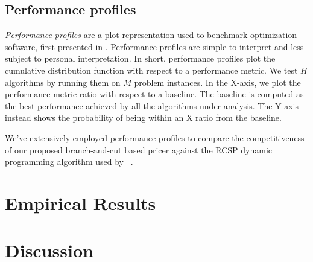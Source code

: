 \subsection{Performance profiles}
\label{sec:results-performance-profiles}

\textit{Performance profiles} are a plot representation used to benchmark optimization software,
first presented in \textcite{dolan2002}.
Performance profiles are simple to interpret and less subject to personal interpretation.
In short, performance profiles plot the cumulative distribution function with respect to a performance metric.
We test $H$ algorithms by running them on $M$ problem instances.
In the X-axis, we plot the performance metric ratio with respect to a baseline.
The baseline is computed as the best performance achieved by all the algorithms under analysis.
The Y-axis instead shows the probability of being within an X ratio from the baseline.

\medskip

We've extensively employed performance profiles to compare the competitiveness of
our proposed branch-and-cut based pricer
against the RCSP dynamic programming algorithm used by \bapcod\ \parencite{pessoa2020a}.

\begin{comment}
In this thesis, we will use performance profiles extensively to measure each solver by exploiting two performance metrics: \textbf{Time metric}, \textbf{Cost metric}.

A \textbf{Time performance profile} will tell us which resolution method is the fastest in terms of runtime.
A \textbf{Cost performance profile}, instead, will show us the cost ratio of the best upper bound obtained from each resolution method.
The ground truth optimal, as extracted from the dataset, is used instead as the cost baseline.
\end{comment}

\section{Empirical Results}
\label{sec:results-empirical-results}



\section{Discussion}
\label{sec:results-discussion}


\begin{comment}
\mytodo{Include the F-n135 grep result to talk about the difficulty of this instance and related ones}
\end{comment}
